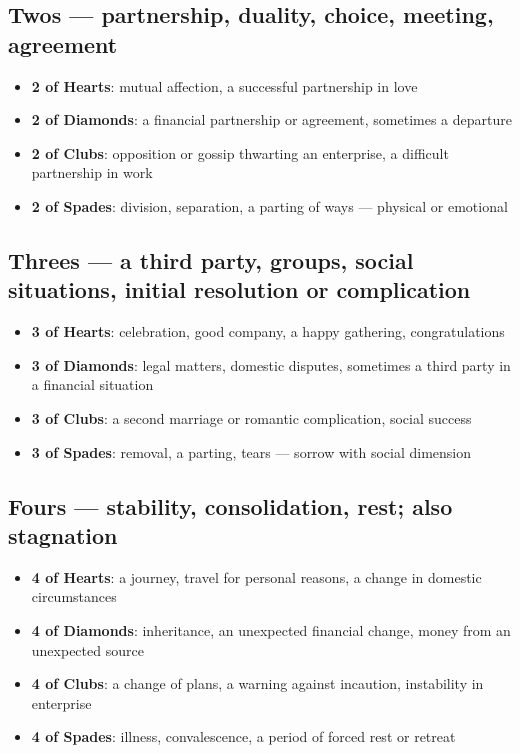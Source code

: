 \subsection{Twos --- partnership, duality, choice, meeting, agreement}\label{twos--partnership-duality-choice-meeting-agreement}

\begin{itemize}
\tightlist
\item
  \textbf{2 of Hearts}: mutual affection, a successful partnership in love
\item
  \textbf{2 of Diamonds}: a financial partnership or agreement, sometimes a departure
\item
  \textbf{2 of Clubs}: opposition or gossip thwarting an enterprise, a difficult partnership in work
\item
  \textbf{2 of Spades}: division, separation, a parting of ways --- physical or emotional
\end{itemize}

\subsection{Threes --- a third party, groups, social situations, initial resolution or complication}\label{threes--a-third-party-groups-social-situations-initial-resolution-or-complication}

\begin{itemize}
\tightlist
\item
  \textbf{3 of Hearts}: celebration, good company, a happy gathering, congratulations
\item
  \textbf{3 of Diamonds}: legal matters, domestic disputes, sometimes a third party in a financial situation
\item
  \textbf{3 of Clubs}: a second marriage or romantic complication, social success
\item
  \textbf{3 of Spades}: removal, a parting, tears --- sorrow with social dimension
\end{itemize}

\subsection{Fours --- stability, consolidation, rest; also stagnation}\label{fours--stability-consolidation-rest-also-stagnation}

\begin{itemize}
\tightlist
\item
  \textbf{4 of Hearts}: a journey, travel for personal reasons, a change in domestic circumstances
\item
  \textbf{4 of Diamonds}: inheritance, an unexpected financial change, money from an unexpected source
\item
  \textbf{4 of Clubs}: a change of plans, a warning against incaution, instability in enterprise
\item
  \textbf{4 of Spades}: illness, convalescence, a period of forced rest or retreat
\end{itemize}

